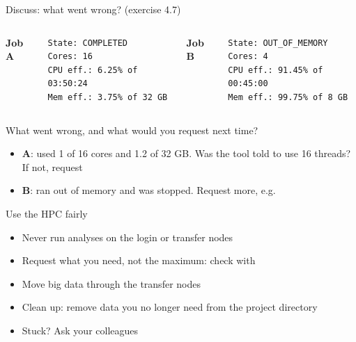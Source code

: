 \begin{frame}[fragile]{Discuss: what went wrong? (exercise 4.7)}
\begin{columns}[T]
    \textbf{Job A}
    \begin{lstlisting}[style=output]
State: COMPLETED
Cores: 16
CPU eff.: 6.25% of 03:50:24
Mem eff.: 3.75% of 32 GB
\end{lstlisting}
    \textbf{Job B}
    \begin{lstlisting}[style=output]
State: OUT_OF_MEMORY
Cores: 4
CPU eff.: 91.45% of 00:45:00
Mem eff.: 99.75% of 8 GB
\end{lstlisting}
\end{columns}
\small
What went wrong, and what would you request next time?
\pause
\begin{itemize}
    \item \textbf{A}: used 1 of 16 cores and 1.2 of 32 GB\@. Was the tool told to use 16 threads?
          If not, request 
    \item \textbf{B}: ran out of memory and was stopped.
          Request more, e.g.\ 
\end{itemize}
\end{frame}

\begin{frame}{Use the HPC fairly}
\begin{itemize}
    \item Never run analyses on the login or transfer nodes
    \item Request what you need, not the maximum: check with 
    \item Move big data through the transfer nodes
    \item Clean up: remove data you no longer need from the project directory
    \item Stuck?
          Ask your colleagues
\end{itemize}
\end{frame}
